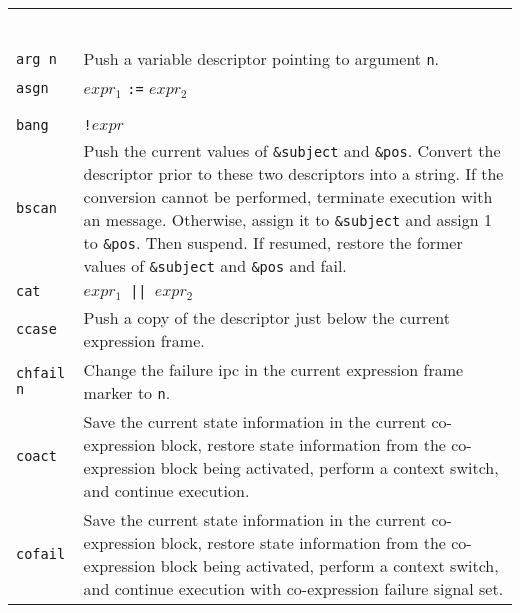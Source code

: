 \begin{xtabular}{l@{\hspace{1.5cm}}p{13.5cm}}

\\
\\
\\
\\
\\
\\

\texttt{arg n} & Push a variable descriptor pointing to argument \texttt{n}.\\

\texttt{asgn}  & $expr_1$ \texttt{:=} $expr_2$\\

\\
\\

\texttt{bang}  & \texttt{!$expr$}\\

\texttt{bscan} & Push the current values of \texttt{\&subject} and
\texttt{\&pos}. Convert the descriptor prior to these two descriptors into a
string.  If the conversion cannot be performed, terminate execution with an
message. Otherwise, assign it to \texttt{\&subject} and assign 1 to
\texttt{\&pos}. Then suspend. If resumed, restore the former values of
\texttt{\&subject} and \texttt{\&pos} and fail.\\

\texttt{cat}   & \texttt{$expr_1$ || $expr_2$}\\

\texttt{ccase} & Push a copy of the descriptor just below the current expression frame.\\

\texttt{chfail n} &  Change the failure ipc in the current expression frame
marker to \texttt{n}.\\

\texttt{coact} & Save the current state information in the current co-expression
block, restore state information from the co-expression block being activated,
perform a context switch, and continue execution.\\

\texttt{cofail} & Save the current state information in the current
co-expression block, restore state information from the co-expression
block being activated, perform a context switch, and continue
execution with co-expression failure signal set.\\


\end{xtabular}
